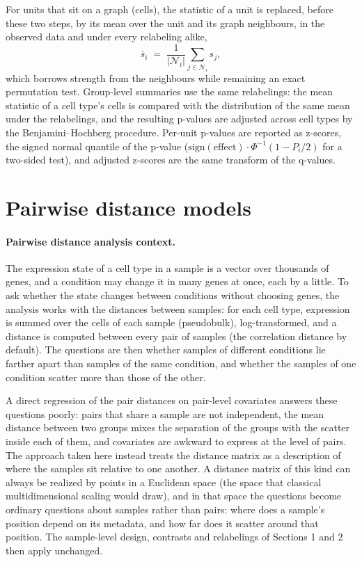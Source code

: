 \documentclass{article}
\begin{document}
For units that sit on a graph (cells), the statistic of a unit is replaced, before these two steps, by its mean over the unit and its graph neighbours, in the observed data and under every relabeling alike,
\begin{equation}
\bar{s}_i \;=\; \frac{1}{|\mathcal{N}_i|}\sum_{j \in \mathcal{N}_i} s_j ,
\end{equation}
which borrows strength from the neighbours while remaining an exact permutation test. Group-level summaries use the same relabelings: the mean statistic of a cell type's cells is compared with the distribution of the same mean under the relabelings, and the resulting p-values are adjusted across cell types by the Benjamini--Hochberg procedure. Per-unit p-values are reported as z-scores, the signed normal quantile of the p-value ($\mathrm{sign}(\text{effect}) \cdot \Phi^{-1}(1 - P_i/2)$ for a two-sided test), and adjusted z-scores are the same transform of the q-values.

\section{Pairwise distance models}

\paragraph{Pairwise distance analysis context.}
The expression state of a cell type in a sample is a vector over thousands of genes, and a condition may change it in many genes at once, each by a little. To ask whether the state changes between conditions without choosing genes, the analysis works with the distances between samples: for each cell type, expression is summed over the cells of each sample (pseudobulk), log-transformed, and a distance is computed between every pair of samples (the correlation distance by default). The questions are then whether samples of different conditions lie farther apart than samples of the same condition, and whether the samples of one condition scatter more than those of the other.

A direct regression of the pair distances on pair-level covariates answers these questions poorly: pairs that share a sample are not independent, the mean distance between two groups mixes the separation of the groups with the scatter inside each of them, and covariates are awkward to express at the level of pairs. The approach taken here instead treats the distance matrix as a description of where the samples sit relative to one another. A distance matrix of this kind can always be realized by points in a Euclidean space (the space that classical multidimensional scaling would draw), and in that space the questions become ordinary questions about samples rather than pairs: where does a sample's position depend on its metadata, and how far does it scatter around that position. The sample-level design, contrasts and relabelings of Sections 1 and 2 then apply unchanged.
\end{document}

